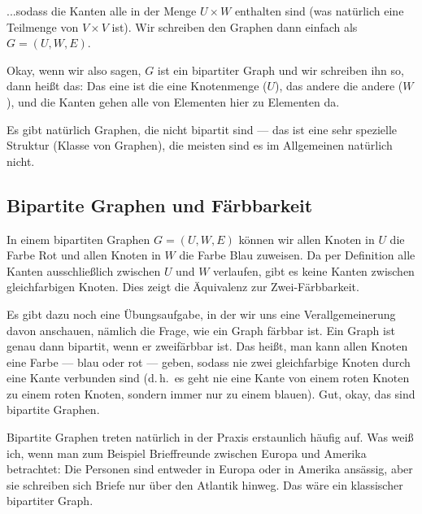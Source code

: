 \begin{spoken-clean}[00:58:30 - 00:59:56]
...sodass die Kanten alle in der Menge $U \times W$ enthalten sind (was natürlich eine Teilmenge von $V \times V$ ist). Wir schreiben den Graphen dann einfach als $G = (U, W, E)$.

Okay, wenn wir also sagen, $G$ ist ein bipartiter Graph und wir schreiben ihn so, dann heißt das: Das eine ist die eine Knotenmenge ($U$), das andere die andere ($W$), und die Kanten gehen alle von Elementen hier zu Elementen da. 

Es gibt natürlich Graphen, die nicht bipartit sind --- das ist eine sehr spezielle Struktur (Klasse von Graphen), die meisten sind es im Allgemeinen natürlich nicht.
\end{spoken-clean}


\subsection{Bipartite Graphen und Färbbarkeit}

\begin{math-stroke}

\begin{explanation-of-steps}
In einem bipartiten Graphen $G = (U, W, E)$ können wir allen Knoten in $U$ die Farbe Rot und allen Knoten in $W$ die Farbe Blau zuweisen. Da per Definition alle Kanten ausschließlich zwischen $U$ und $W$ verlaufen, gibt es keine Kanten zwischen gleichfarbigen Knoten. Dies zeigt die Äquivalenz zur Zwei-Färbbarkeit.
\end{explanation-of-steps}
\end{math-stroke}

\begin{spoken-clean}[00:59:56 - 01:01:08]
Es gibt dazu noch eine Übungsaufgabe, in der wir uns eine Verallgemeinerung davon anschauen, nämlich die Frage, wie ein Graph färbbar ist. Ein Graph ist genau dann bipartit, wenn er zweifärbbar ist. Das heißt, man kann allen Knoten eine Farbe --- blau oder rot --- geben, sodass nie zwei gleichfarbige Knoten durch eine Kante verbunden sind (d.\,h.\ es geht nie eine Kante von einem roten Knoten zu einem roten Knoten, sondern immer nur zu einem blauen). Gut, okay, das sind bipartite Graphen.

Bipartite Graphen treten natürlich in der Praxis erstaunlich häufig auf. Was weiß ich, wenn man zum Beispiel Brieffreunde zwischen Europa und Amerika betrachtet: Die Personen sind entweder in Europa oder in Amerika ansässig, aber sie schreiben sich Briefe nur über den Atlantik hinweg. Das wäre ein klassischer bipartiter Graph.
\end{spoken-clean}

